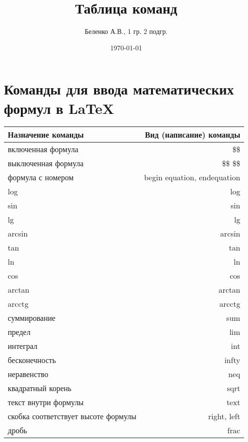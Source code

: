 \documentclass[a4paper,12pt]{article} %
\author{Беленко А.В., 1 гр. 2 подгр.} %
\title{Таблица команд} %
\date{\today} %
\begin{document}
\maketitle
\newpage
\section*{Команды для ввода математических формул в \LaTeX}
\begin{tabular}{ l | r }
  \textbf{Назначение команды}		  & \textbf{Вид (написание) команды} \\ \hline
  включенная формула				  &\$\$ \\ \hline
  выключенная формула				  &\$\$ \$\$ \\ \hline
  формула с номером					  & begin {equation}, end{equation} \\ \hline
  log								  & log \\ \hline
  sin								  & sin \\ \hline
  lg								  & lg \\ \hline
  arcsin							  & arcsin \\ \hline
  tan								  & tan \\ \hline
  ln								  & ln \\ \hline
  cos								  & cos \\ \hline
  arctan							  & arctan \\ \hline
  arcctg							  & arcctg \\ \hline
  суммирование						  & sum \\ \hline
  предел							  & lim \\ \hline
  интеграл							  & int \\ \hline
  бесконечность						  & infty \\ \hline
  неравенство						  & neq \\ \hline
  квадратный корень					  & sqrt \\ \hline
  текст внутри формулы 				  & text \\ \hline
  скобка соответствует высоте формулы & right, left \\ \hline
  дробь								  & frac
\end{tabular}
\end{document}
